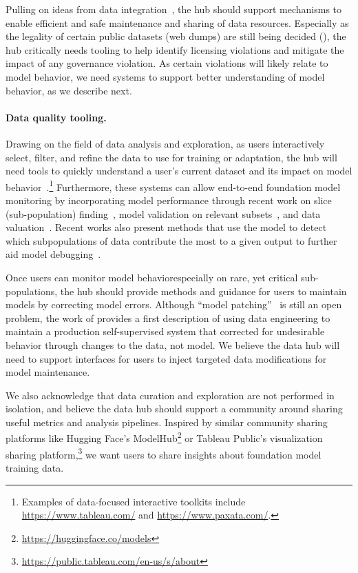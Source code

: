 Pulling on ideas from data integration~\citep{rekatsinas2017slimfast}, the hub should support mechanisms to enable efficient and safe maintenance and sharing of data resources. Especially as the legality of certain public datasets (\eg web dumps) are still being decided (), the hub critically needs tooling to help identify licensing violations and mitigate the impact of any governance violation. As certain violations will likely relate to model behavior, we need systems to support better understanding of model behavior, as we describe next.

\paragraph{Data quality tooling.} Drawing on the field of data analysis and exploration, as users interactively select, filter, and refine the data to use for training or adaptation, the hub will need tools to quickly understand a user's current dataset and its impact on model behavior~\citep{hohman2020understanding}.\footnote{Examples of data-focused interactive toolkits include \url{https://www.tableau.com/} and \url{https://www.paxata.com/}.} Furthermore, these systems can allow end-to-end foundation model monitoring by incorporating model performance through recent work on slice (sub-population) finding~\citep{chung2019slice}, model validation on relevant subsets~\citep{goel2021robustnessgym, ribeiro2020beyond}, and data valuation~\citep{ghorbani2019data}. Recent works also present methods that use the model to detect which subpopulations of data contribute the most to a given output to further aid model debugging~\citep{keskar2019ctrl}.

Once users can monitor model behavior\textemdash especially on rare, yet critical sub-populations\textemdash, the hub should provide methods and guidance for users to maintain models by correcting model errors. Although ``model patching''~\citep{goel2020model} is still an open problem, the work of \citep{orr2020bootleg} provides a first description of using data engineering to maintain a production self-supervised system that corrected for undesirable behavior through changes to the data, not model. We believe the data hub will need to support interfaces for users to inject targeted data modifications for model maintenance.

We also acknowledge that data curation and exploration are not performed in isolation, and believe the data hub should support a community around sharing useful metrics and analysis pipelines. Inspired by similar community sharing platforms like Hugging Face’s ModelHub\footnote{\url{https://huggingface.co/models}} or Tableau Public’s visualization sharing platform,\footnote{\url{https://public.tableau.com/en-us/s/about}} we want users to share insights about foundation model training data.

